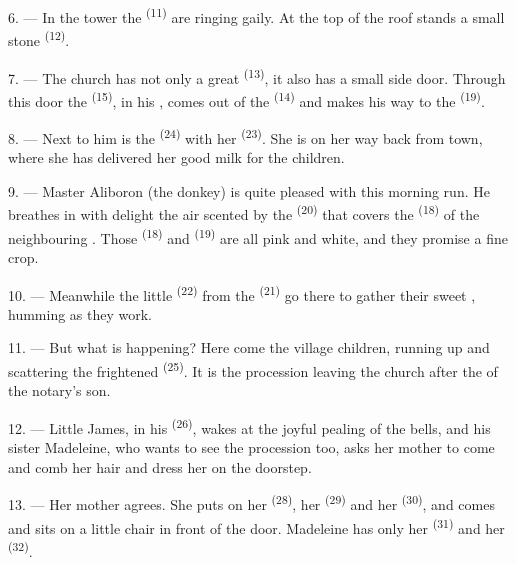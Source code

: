 6. --- In the tower the  \textsuperscript{(11)} are ringing gaily. At the top of
the roof stands a small stone  \textsuperscript{(12)}.

7. --- The church has not only a great  \textsuperscript{(13)}, it also has a
small side door. Through this door the  \textsuperscript{(15)}, in his
, comes out of the  \textsuperscript{(14)} and makes his way to
the  \textsuperscript{(19)}.

8. --- Next to him is the  \textsuperscript{(24)} with her
 \textsuperscript{(23)}. She is on her way back from town, where she has
delivered her good milk for the children.

\VUsaut{4.0mm}
\VUsaut{3.4mm}

9. --- Master Aliboron (the donkey) is quite pleased with this morning run. He breathes in
with delight the air scented by the  \textsuperscript{(20)} that covers the
 \textsuperscript{(18)} of the neighbouring . Those
 \textsuperscript{(18)} and  \textsuperscript{(19)} are all
pink and white, and they promise a fine crop.

10. --- Meanwhile the little  \textsuperscript{(22)} from the
 \textsuperscript{(21)} go there to gather their sweet ,
humming as they work.

11. --- But what is happening? Here come the village children, running up and scattering the
frightened  \textsuperscript{(25)}. It is the procession leaving the church
after the  of the notary's son.

12. --- Little James, in his  \textsuperscript{(26)}, wakes at the joyful
pealing of the bells, and his sister Madeleine, who wants to see the procession too, asks her
mother to come and comb her hair and dress her on the doorstep.

13. --- Her mother agrees. She puts on her  \textsuperscript{(28)}, her
 \textsuperscript{(29)} and her  \textsuperscript{(30)}, and
comes and sits on a little chair in front of the door. Madeleine has only her
 \textsuperscript{(31)} and her
 \textsuperscript{(32)}.

